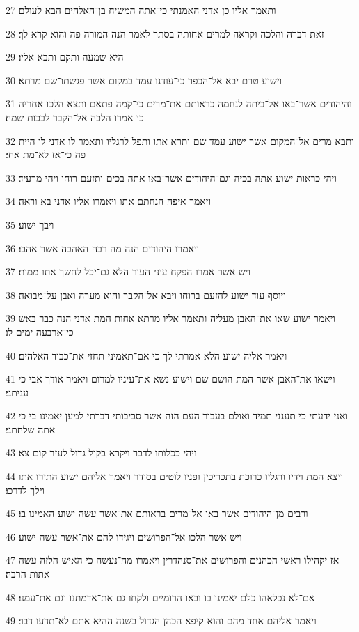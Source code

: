 \par 27 ותאמר אליו כן אדני האמנתי כי־אתה המשיח בן־האלהים הבא לעולם׃
\par 28 זאת דברה והלכה וקראה למרים אחותה בסתר לאמר הנה המורה פה והוא קרא לך׃
\par 29 היא שמעה ותקם ותבא אליו׃
\par 30 וישוע טרם יבא אל־הכפר כי־עודנו עמד במקום אשר פגשתו־שם מרתא׃
\par 31 והיהודים אשר־באו אל־ביתה לנחמה כראותם את־מרים כי־קמה פתאם ותצא הלכו אחריה כי אמרו הלכה אל־הקבר לבכות שמה׃
\par 32 ותבא מרים אל־המקום אשר ישוע עמד שם ותרא אתו ותפל לרגליו ותאמר לו אדני לו היית פה כי־אז לא־מת אחי׃
\par 33 ויהי כראות ישוע אתה בכיה וגם־היהודים אשר־באו אתה בכים ותזעם רוחו ויהי מרעיד׃
\par 34 ויאמר איפה הנחתם אתו ויאמרו אליו אדני בא וראה׃
\par 35 ויבך ישוע׃
\par 36 ויאמרו היהודים הנה מה רבה האהבה אשר אהבו׃
\par 37 ויש אשר אמרו הפקח עיני העור הלא גם־יכל לחשך אתו ממות׃
\par 38 ויוסף עוד ישוע להזעם ברוחו ויבא אל־הקבר והוא מערה ואבן על־מבואה׃
\par 39 ויאמר ישוע שאו את־האבן מעליה ותאמר אליו מרתא אחות המת אדני הנה כבר באש כי־ארבעה ימים לו׃
\par 40 ויאמר אליה ישוע הלא אמרתי לך כי אם־תאמיני תחזי את־כבוד האלהים׃
\par 41 וישאו את־האבן אשר המת הושם שם וישוע נשא את־עיניו למרום ויאמר אודך אבי כי עניתני׃
\par 42 ואני ידעתי כי תענני תמיד ואולם בעבור העם הזה אשר סביבותי דברתי למען יאמינו בי כי אתה שלחתני׃
\par 43 ויהי ככלותו לדבר ויקרא בקול גדול לעזר קום צא׃
\par 44 ויצא המת וידיו ורגליו כרוכת בתכריכין ופניו לוטים בסודר ויאמר אליהם ישוע התירו אתו וילך לדרכו׃
\par 45 ורבים מן־היהודים אשר באו אל־מרים בראותם את־אשר עשה ישוע האמינו בו׃
\par 46 ויש אשר הלכו אל־הפרושים ויגידו להם את־אשר עשה ישוע׃
\par 47 אז יקהילו ראשי הכהנים והפרושים את־סנהדרין ויאמרו מה־נעשה כי האיש הלזה עשה אתות הרבה׃
\par 48 אם־לא נכלאהו כלם יאמינו בו ובאו הרומיים ולקחו גם את־אדמתנו וגם את־עמנו׃
\par 49 ויאמר אליהם אחד מהם והוא קיפא הכהן הגדול בשנה ההיא אתם לא־תדעו דבר׃
